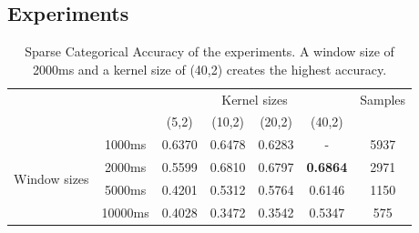 \documentclass[runningheads]{llncs}
\begin{document}
\subsection{Experiments}

\begin{table}[]
\centering
\setlength{\tabcolsep}{0.5em} %
{\renewcommand{\arraystretch}{1.2}%
\begin{tabular}{cc|c|c|c|c|c|}
\cline{3-7}
                                                    &         & \multicolumn{4}{c|}{Kernel sizes}          & Samples \\ \cline{3-7} 
                                                    &         & (5,2)  & (10,2) & (20,2) & (40,2)          &         \\ \hline
\multicolumn{1}{|c|}{\multirow{4}{*}{Window sizes}} & 1000ms  & 0.6370 & 0.6478 & 0.6283 & -               & 5937    \\ \cline{2-7} 
\multicolumn{1}{|c|}{}                              & 2000ms  & 0.5599 & 0.6810 & 0.6797 & \textbf{0.6864} & 2971    \\ \cline{2-7} 
\multicolumn{1}{|c|}{}                              & 5000ms  & 0.4201 & 0.5312 & 0.5764 & 0.6146          & 1150    \\ \cline{2-7} 
\multicolumn{1}{|c|}{}                              & 10000ms & 0.4028 & 0.3472 & 0.3542 & 0.5347          & 575     \\ \hline
\end{tabular}
}
\caption{Sparse Categorical Accuracy of the experiments. A window size of 2000ms and a kernel size of (40,2) creates the highest accuracy.}
\label{table:configurations}
\end{table}
\end{document}
